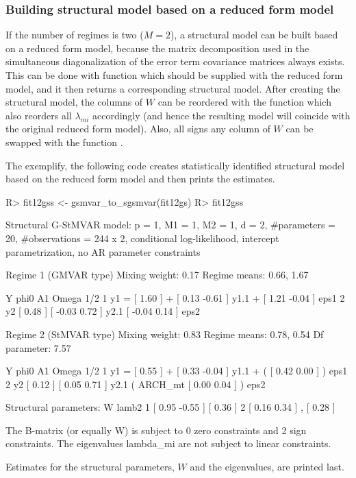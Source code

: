 \documentclass[nojss]{jss}
\begin{document}
\subsubsection{Building structural model based on a reduced form model}
If the number of regimes is two ($M=2$), a structural model can be built based on a reduced form model, because the matrix decomposition used in the simultaneous diagonalization of the error term covariance matrices always exists. This can be done with function  which should be supplied with the reduced form model, and it then returns a corresponding structural model. After creating the structural model, the columns of $W$ can be reordered with the function  which also reorders all $\lambda_{mi}$ accordingly (and hence the resulting model will coincide with the original reduced form model). Also, all signs any column of $W$ can be swapped with the function .

The exemplify, the following code creates statistically identified structural model based on the reduced form model  and then prints the estimates.
%
\begin{CodeChunk}
\begin{CodeInput}
R> fit12gss <- gsmvar_to_sgsmvar(fit12gs)
R> fit12gss
\end{CodeInput}
\begin{CodeOutput}
Structural G-StMVAR model:
 p = 1, M1 = 1, M2 = 1, d = 2, #parameters = 20, #observations = 244 x 2,
 conditional log-likelihood, intercept parametrization, no AR parameter
 constraints

Regime 1 (GMVAR type)
Mixing weight: 0.17
Regime means: 0.66, 1.67

   Y     phi0          A1                  Omega         1/2
1 y1 = [ 1.60 ] + [  0.13 -0.61 ] y1.1 + [  1.21 -0.04 ]     eps1
2 y2   [ 0.48 ]   [ -0.03  0.72 ] y2.1   [ -0.04  0.14 ]     eps2

Regime 2 (StMVAR type)
Mixing weight: 0.83
Regime means: 0.78, 0.54
Df parameter:  7.57

   Y     phi0          A1                            Omega          1/2
1 y1 = [ 0.55 ] + [  0.33 -0.04 ] y1.1 + (         [  0.42 0.00 ] )     eps1
2 y2   [ 0.12 ]   [  0.05  0.71 ] y2.1   ( ARCH_mt [  0.00 0.04 ] )     eps2

Structural parameters:
        W             lamb2
1 [  0.95 -0.55 ]   [  0.36 ]
2 [  0.16  0.34 ] , [  0.28 ]

The B-matrix (or equally W) is subject to 0 zero constraints and 2 sign
constraints. The eigenvalues lambda_{mi} are not subject to linear constraints.
\end{CodeOutput}
\end{CodeChunk}
%
Estimates for the structural parameters, $W$ and the eigenvalues, are printed last.
\end{document}
